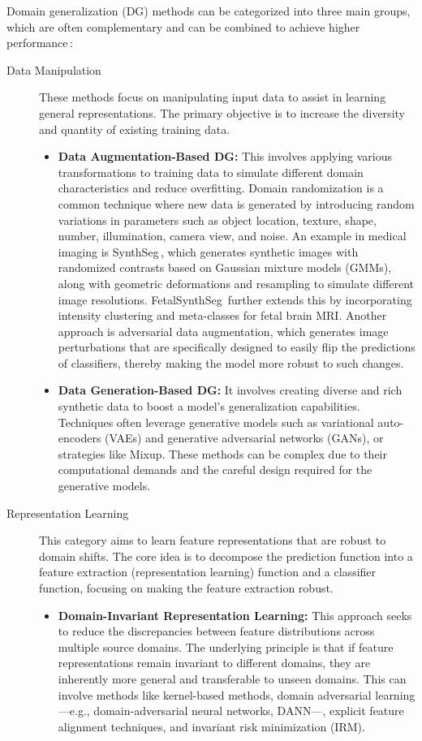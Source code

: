 Domain generalization (DG) methods can be categorized into three main groups, which are often complementary and can be combined to achieve higher performance\,\cite{Wang2023}:
\begin{description}
    \item[Data Manipulation] These methods focus on manipulating input data to assist in learning general representations. The primary objective is to increase the diversity and quantity of existing training data.
    \begin{itemize}
        \item \textbf{Data Augmentation-Based DG:} This involves applying various transformations to training data  to simulate different domain characteristics and reduce overfitting. Domain randomization is a common technique where new data is generated by introducing random variations in parameters such as object location, texture, shape, number, illumination, camera view, and noise. An example in medical imaging is SynthSeg\,\cite{Billot2023}, which generates synthetic images with randomized contrasts based on Gaussian mixture models (GMMs), along with geometric deformations and resampling to simulate different image resolutions. FetalSynthSeg\,\cite{Billot2023} further extends this by incorporating intensity clustering and meta-classes for fetal brain MRI. Another approach is adversarial data augmentation, which generates image perturbations that are specifically designed to easily flip the predictions of classifiers, thereby making the model more robust to such changes.
        \item \textbf{Data Generation-Based DG:} It involves creating diverse and rich synthetic data to boost a model's generalization capabilities. Techniques often leverage generative models such as variational auto-encoders (VAEs) and generative adversarial networks (GANs), or strategies like Mixup. These methods can be complex due to their computational demands and the careful design required for the generative models.
    \end{itemize}
    \item[Representation Learning] This category aims to learn feature representations that are robust to domain shifts. The core idea is to decompose the prediction function into a feature extraction (representation learning) function and a classifier function, focusing on making the feature extraction robust.
    \begin{itemize}
        \item \textbf{Domain-Invariant Representation Learning:} This approach seeks to reduce the discrepancies between feature distributions across multiple source domains. The underlying principle is that if feature representations remain invariant to different domains, they are inherently more general and transferable to unseen domains. This can involve methods like kernel-based methods, domain adversarial learning---e.g., domain-adversarial neural networks, DANN---, explicit feature alignment techniques, and invariant risk minimization (IRM).

\end{itemize}
\end{description}

